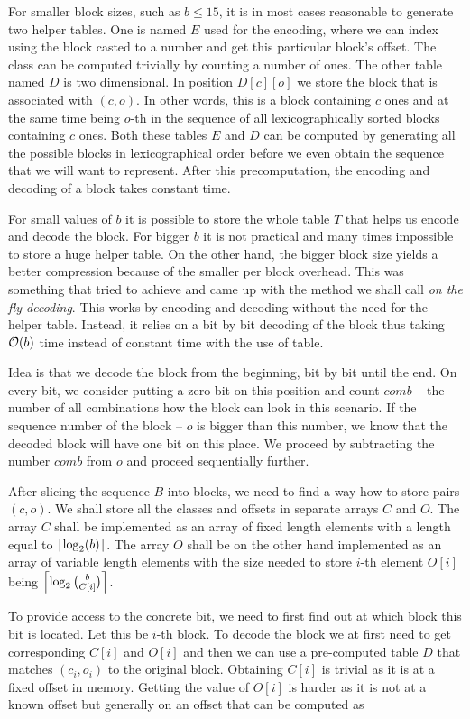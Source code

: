 For smaller block sizes, such as $b\leq 15$, it is in most cases reasonable to
generate two helper tables. One is named $E$ used for the encoding, where we can
index using the block casted to a number and get this particular block's offset.
The class can be computed trivially by counting a number of ones. The other table
named $D$ is two dimensional. In position $D[c][o]$ we store the block that
is associated with $(c, o)$. In other words, this is a block containing $c$ ones
and at the same time being $o$-th in the sequence of all lexicographically sorted
blocks containing $c$ ones. Both these tables $E$ and $D$ can be computed
by generating all the possible blocks in lexicographical order before we even
obtain the sequence that we will want to represent. After this precomputation,
the encoding and decoding of a block takes constant time.

For small values of $b$ it is possible to store the whole table $T$ that helps us
encode and decode the block. For bigger $b$ it is not practical and many times
impossible to store a huge helper table. On the other hand, the bigger block size
yields a better compression because of the smaller per block overhead. This was
something that \cite{navarro2012fast} tried to achieve and came up with the method
we shall call \textit{on the fly-decoding}. This works by encoding and decoding without
the need for the helper table. Instead, it relies on a bit by bit decoding of the block
thus taking $\mathcal{O}(b)$ time instead of constant time with the use of table.

Idea is that we decode the block from the beginning, bit by bit until the end. On every bit,
we consider putting a zero bit on this position and count $comb$ -- the number of all
combinations how the block can look in this scenario. If the sequence number of the block --
$o$ is bigger than this number, we know that the decoded block will have one bit on this place.
We proceed by subtracting the number $comb$ from $o$ and proceed sequentially further.

After slicing the sequence $B$ into blocks, we need to find a way how to store pairs $(c, o)$.
We shall store all the classes and offsets in separate arrays $C$ and $O$. The array $C$ shall
be implemented as an array of fixed length elements with a length equal to
$\left\lceil \log_2(b) \right\rceil$. The array $O$ shall be on the other hand implemented as an array of
variable length elements with the size needed to store $i$-th element $O[i]$ being
$\left\lceil \log_2{b\choose C[i]} \right\rceil$.

To provide access to the concrete bit, we need to first find out at which block this bit is located.
Let this be $i$-th block. To decode the block we at first need to get corresponding $C[i]$ and
$O[i]$ and then we can use a pre-computed table $D$ that matches $(c_i, o_i)$ to the original
block. Obtaining $C[i]$ is trivial as it is at a fixed offset in memory. Getting the value of
$O[i]$ is harder as it is not at a known offset but generally on an offset that can be computed
as

